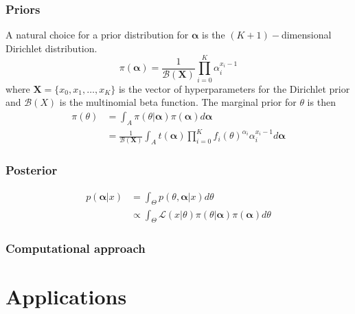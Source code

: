 \documentclass[a4paper, notitlepage, 10pt]{article}
\begin{document}
\subsubsection*{Priors}
A natural choice for a prior distribution for $\boldsymbol\alpha$ is the $(K+1)-$dimensional Dirichlet distribution.
\begin{equation}
 \label{eq:generalcondprior}
 \pi(\boldsymbol\alpha) = \frac{1}{\mathcal{B}(\boldsymbol X)}\prod_{i=0}^K \alpha_i^{x_i-1}
\end{equation}
where $\boldsymbol X = \{ x_0, x_1, \ldots, x_K\}$ is the vector of hyperparameters for the Dirichlet prior and $\mathcal{B}(X)$ is the multinomial beta function.
The marginal prior for $\theta$ is then
\begin{align}
 \label{eq:marginalhierprior}
 \pi(\theta) &= \int_{A}\pi(\theta|\boldsymbol\alpha)\pi(\boldsymbol\alpha)d\boldsymbol\alpha \\
             &= \frac{1}{\mathcal{B}(\boldsymbol X)}\int_{A}t(\boldsymbol\alpha)\prod_{i=0}^K f_i(\theta)^{\alpha_i}\alpha_i^{x_i-1}d\boldsymbol\alpha 
\end{align}

\subsubsection*{Posterior}
\begin{align}
 \label{eq:alpha_posterior}
 p(\boldsymbol\alpha | x) &= \int_{\Theta}  p(\theta, \boldsymbol\alpha | x) d\theta \\
  &\propto  \int_{\Theta} \mathcal{L}(x | \theta) \pi(\theta | \boldsymbol\alpha) \pi(\boldsymbol\alpha) d\theta
\end{align}

\subsubsection*{Computational approach}

\section*{Applications}
\label{sec:apps}
\end{document}
